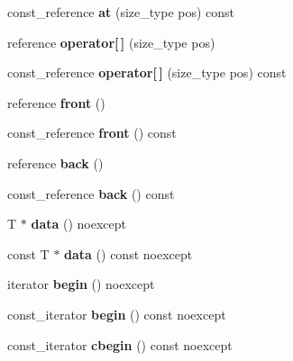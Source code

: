 \begin{DoxyCompactItemize}
\item 
\mbox{\label{classvector_a8de5c6b09d7148c25f51aca3de557089}} 
const\+\_\+reference {\bfseries at} (size\+\_\+type pos) const
\item 
\mbox{\label{classvector_abd5107235cf7e63bdd18ca7659a73dd5}} 
reference {\bfseries operator\mbox{[}$\,$\mbox{]}} (size\+\_\+type pos)
\item 
\mbox{\label{classvector_a8f1bea5f15305fa3bdff3a58f44071d3}} 
const\+\_\+reference {\bfseries operator\mbox{[}$\,$\mbox{]}} (size\+\_\+type pos) const
\item 
\mbox{\label{classvector_af8e649686c1114d04b7fdf9cbd190649}} 
reference {\bfseries front} ()
\item 
\mbox{\label{classvector_a198a39c3dac5703a8c84e74f9cd752e5}} 
const\+\_\+reference {\bfseries front} () const
\item 
\mbox{\label{classvector_af3348ff2353d98e4bf619bb2a09aad66}} 
reference {\bfseries back} ()
\item 
\mbox{\label{classvector_a776bbcf1a4d8305da69477f6abf7d444}} 
const\+\_\+reference {\bfseries back} () const
\item 
\mbox{\label{classvector_a79081fdf5cab4e0e197abc5020733a77}} 
T $\ast$ {\bfseries data} () noexcept
\item 
\mbox{\label{classvector_a9ee3af87a9207db02d042d4095c5c497}} 
const T $\ast$ {\bfseries data} () const noexcept
\item 
\mbox{\label{classvector_a81c603f2f41ffd444a153e0a74c82741}} 
iterator {\bfseries begin} () noexcept
\item 
\mbox{\label{classvector_ad32c0084a29683cd4adff2fb82a4b0c5}} 
const\+\_\+iterator {\bfseries begin} () const noexcept
\item 
\mbox{\label{classvector_a97e99b064b0e2f4cbf21dd345584b760}} 
const\+\_\+iterator {\bfseries cbegin} () const noexcept

\end{DoxyCompactItemize}

